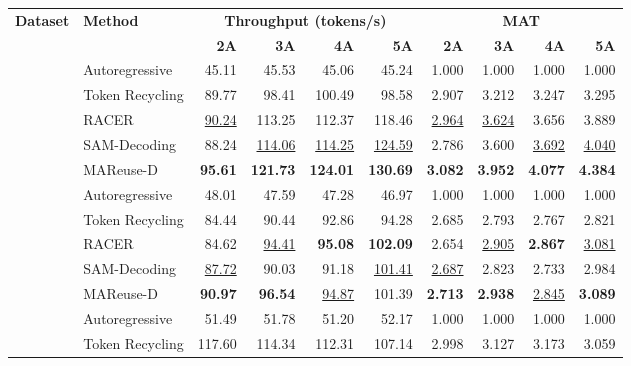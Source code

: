 \documentclass[letterpaper]{article} %
\newcommand{\thickhline}{\noalign{\hrule height 0.8pt}}
\begin{document}
\begin{table}[t]
\centering
\small
\setlength{\tabcolsep}{11pt}
\begin{tabular}{c|l|rrrr|rrrr}
\thickhline
\textbf{Dataset} & \textbf{Method} & \multicolumn{4}{c}{\textbf{Throughput (tokens/s)}} & \multicolumn{4}{c}{\textbf{MAT}} \\
\cline{3-6}\cline{7-10}
 & & \textbf{2A} & \textbf{3A} & \textbf{4A} & \textbf{5A} & \textbf{2A} & \textbf{3A} & \textbf{4A} & \textbf{5A} \\
\hline
\addlinespace[1pt]
\multirow{5}{*}{GSM8K} & Autoregressive & 45.11 & 45.53 & 45.06 & 45.24 & 1.000 & 1.000 & 1.000 & 1.000 \\
 \addlinespace[1pt]
 & Token Recycling & 89.77 & 98.41 & 100.49 & 98.58 & 2.907 & 3.212 & 3.247 & 3.295 \\
 \addlinespace[1pt]
 & RACER & \underline{90.24} & 113.25 & 112.37 & 118.46 & \underline{2.964} & \underline{3.624} & 3.656 & 3.889 \\
 \addlinespace[1pt]
 & SAM-Decoding & 88.24 & \underline{114.06} & \underline{114.25} & \underline{124.59} & 2.786 & 3.600 & \underline{3.692} & \underline{4.040} \\
 \addlinespace[1pt]
 & MAReuse-D & \textbf{95.61} & \textbf{121.73} & \textbf{124.01} & \textbf{130.69} & \textbf{3.082} & \textbf{3.952} & \textbf{4.077} & \textbf{4.384} \\
\hline
\addlinespace[1pt]
\multirow{5}{*}{MMLU} & Autoregressive & 48.01 & 47.59 & 47.28 & 46.97 & 1.000 & 1.000 & 1.000 & 1.000 \\
 \addlinespace[1pt]
 & Token Recycling & 84.44 & 90.44 & 92.86 & 94.28 & 2.685 & 2.793 & 2.767 & 2.821 \\
 \addlinespace[1pt]
 & RACER & 84.62 & \underline{94.41} & \textbf{95.08} & \textbf{102.09} & 2.654 & \underline{2.905} & \textbf{2.867} & \underline{3.081} \\
 \addlinespace[1pt]
 & SAM-Decoding & \underline{87.72} & 90.03 & 91.18 & \underline{101.41} & \underline{2.687} & 2.823 & 2.733 & 2.984 \\
 \addlinespace[1pt]
 & MAReuse-D & \textbf{90.97} & \textbf{96.54} & \underline{94.87} & 101.39 & \textbf{2.713} & \textbf{2.938} & \underline{2.845} & \textbf{3.089} \\
\hline
\addlinespace[1pt]
\multirow{5}{*}{HumanEval} & Autoregressive & 51.49 & 51.78 & 51.20 & 52.17 & 1.000 & 1.000 & 1.000 & 1.000 \\
 \addlinespace[1pt]
 & Token Recycling & 117.60 & 114.34 & 112.31 & 107.14 & 2.998 & 3.127 & 3.173 & 3.059 \\

\end{tabular}
\end{table}
\end{document}
